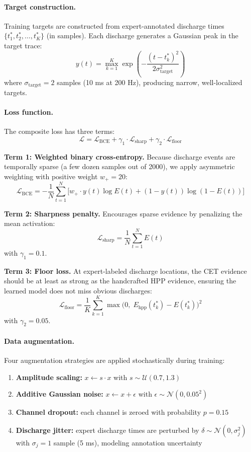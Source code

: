 \paragraph{Target construction.}
Training targets are constructed from expert-annotated discharge times $\{t_1^*, t_2^*, \ldots, t_K^*\}$ (in samples). Each discharge generates a Gaussian peak in the target trace:
\[ y(t) = \max_{k=1}^{K} \exp\!\left(-\frac{(t - t_k^*)^2}{2\sigma_{\mathrm{target}}^2}\right) \tag{3} \]
where $\sigma_{\mathrm{target}} = 2$ samples (10 ms at 200 Hz), producing narrow, well-localized targets.

\paragraph{Loss function.}
The composite loss has three terms:
\[ \mathcal{L} = \mathcal{L}_{\mathrm{BCE}} + \gamma_1 \cdot \mathcal{L}_{\mathrm{sharp}} + \gamma_2 \cdot \mathcal{L}_{\mathrm{floor}} \tag{4} \]

\textbf{Term 1: Weighted binary cross-entropy.} Because discharge events are temporally sparse (a few dozen samples out of 2000), we apply asymmetric weighting with positive weight $w_+ = 20$:
\[ \mathcal{L}_{\mathrm{BCE}} = -\frac{1}{N} \sum_{t=1}^{N} \Big[ w_+ \cdot y(t) \log E(t) + (1 - y(t)) \log(1 - E(t)) \Big] \tag{5} \]

\textbf{Term 2: Sharpness penalty.} Encourages sparse evidence by penalizing the mean activation:
\[ \mathcal{L}_{\mathrm{sharp}} = \frac{1}{N} \sum_{t=1}^{N} E(t) \tag{6} \]
with $\gamma_1 = 0.1$.

\textbf{Term 3: Floor loss.} At expert-labeled discharge locations, the CET evidence should be at least as strong as the handcrafted HPP evidence, ensuring the learned model does not miss obvious discharges:
\[ \mathcal{L}_{\mathrm{floor}} = \frac{1}{K} \sum_{k=1}^{K} \max\!\big(0,\; E_{\mathrm{hpp}}(t_k^*) - E(t_k^*)\big)^2 \tag{7} \]
with $\gamma_2 = 0.05$.

\paragraph{Data augmentation.}
Four augmentation strategies are applied stochastically during training:
\begin{enumerate}
  \item \textbf{Amplitude scaling:} $x \leftarrow s \cdot x$ with $s \sim \mathcal{U}(0.7, 1.3)$
  \item \textbf{Additive Gaussian noise:} $x \leftarrow x + \epsilon$ with $\epsilon \sim \mathcal{N}(0, 0.05^2)$
  \item \textbf{Channel dropout:} each channel is zeroed with probability $p = 0.15$
  \item \textbf{Discharge jitter:} expert discharge times are perturbed by $\delta \sim \mathcal{N}(0, \sigma_j^2)$ with $\sigma_j = 1$ sample (5 ms), modeling annotation uncertainty
\end{enumerate}

